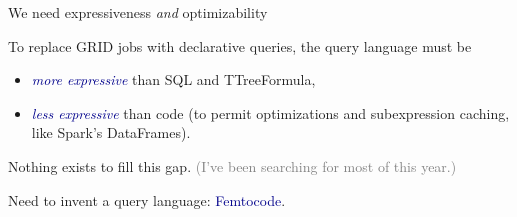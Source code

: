 \documentclass{beamer}
\begin{document}
\begin{frame}{We need expressiveness {\it and} optimizability}
\vspace{0.5 cm}
\begin{center}
\begin{minipage}{0.9\linewidth}
To replace GRID jobs with declarative queries, the query \mbox{language} must be
\begin{itemize}
\item \textcolor{darkblue}{\it more expressive} than SQL and TTreeFormula,
\item \textcolor{darkblue}{\it less expressive} than code (to permit optimizations and subexpression caching, like Spark's DataFrames).
\end{itemize}

\vspace{0.5 cm}
Nothing exists to fill this gap. \textcolor{gray}{(I've been searching for most of this year.)}

\vspace{0.5 cm}
Need to invent a query language: \textcolor{darkblue}{Femtocode}.
\end{minipage}
\end{center}
\end{frame}

\end{document}
